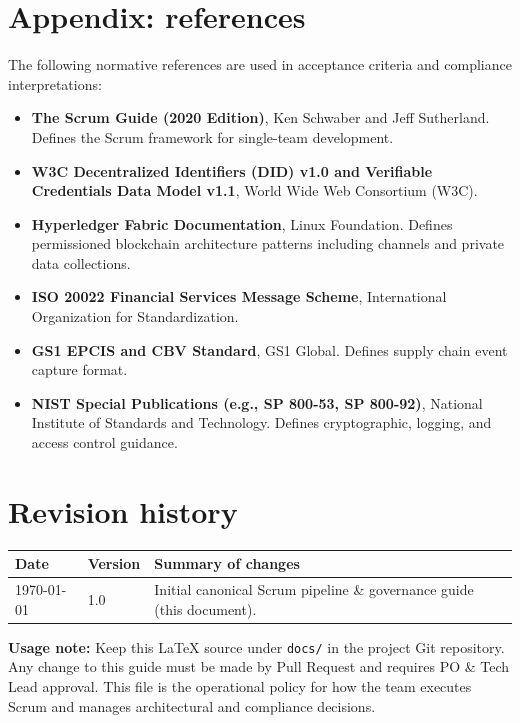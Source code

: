 \documentclass[11pt,a4paper]{article}
\begin{document}
\section{Appendix: references}
The following normative references are used in acceptance criteria and compliance interpretations:
\begin{itemize}[noitemsep]
  \item \textbf{The Scrum Guide (2020 Edition)}, 
  Ken Schwaber and Jeff Sutherland. Defines the Scrum framework for single-team development.
  \item \textbf{W3C Decentralized Identifiers (DID) v1.0 and Verifiable Credentials Data Model v1.1}, 
  World Wide Web Consortium (W3C).
  \item \textbf{Hyperledger Fabric Documentation}, 
  Linux Foundation. Defines permissioned blockchain architecture patterns 
  including channels and private data collections.
  \item \textbf{ISO 20022 Financial Services Message Scheme}, 
  International Organization for Standardization.
  \item \textbf{GS1 EPCIS and CBV Standard}, 
  GS1 Global. Defines supply chain event capture format.
  \item \textbf{NIST Special Publications (e.g., SP 800-53, SP 800-92)}, 
  National Institute of Standards and Technology. 
  Defines cryptographic, logging, and access control guidance.
\end{itemize}

\section{Revision history}
\begin{tabular}{p{} p{} p{}}
\toprule
Date & Version & Summary of changes \\
\midrule
\today & 1.0 & Initial canonical Scrum pipeline \& governance guide (this document). \\
\bottomrule
\end{tabular}

\bigskip
\noindent
\hrulefill

\noindent \textbf{Usage note:} Keep this LaTeX source under \texttt{docs/} in the project Git repository. Any change to this guide must be made by Pull Request and requires PO \& Tech Lead approval. This file is the operational policy for how the team executes Scrum and manages architectural and compliance decisions.
\end{document}
